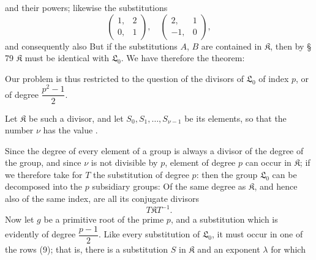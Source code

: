 and their powers; likewise the substitutions
\[
\begin{pmatrix} 1, & 2 \\ 0, & 1 \end{pmatrix},\quad \begin{pmatrix} 2, & 1 \\ -1, & 0 \end{pmatrix},
\]
and consequently also
But if the substitutions $A$, $B$ are contained in $\mathfrak{K}$, then by § 79 $\mathfrak{K}$ must be identical with $\mathfrak{L}_0$. We have therefore the theorem:


Our problem is thus restricted to the question of the divisors of $\mathfrak{L}_0$ of index $p$, or of degree $\dfrac{p^2-1}{2}$.

Let $\mathfrak{K}$ be such a divisor, and let $S_0, S_1, \ldots, S_{\nu-1}$ be its elements, so that the number $\nu$ has the value
.

Since the degree of every element of a group is always a divisor of the degree of the group, and since $\nu$ is not divisible by $p$,  element of degree $p$ can occur in $\mathfrak{K}$; if we therefore take for $T$ the substitution of degree $p$:
then the group $\mathfrak{L}_0$ can be decomposed into the $p$ subsidiary groups:
Of the same degree as $\mathfrak{K}$, and hence also of the same index, are all its conjugate divisors
\[
T\mathfrak{K}T^{-1}.
\]
Now let $g$ be a primitive root of the prime $p$, and
a substitution which is evidently of degree $\dfrac{p-1}{2}$. Like every substitution of $\mathfrak{L}_0$, it must occur in one of the rows (9); that is, there is a substitution $S$ in $\mathfrak{K}$ and an exponent $\lambda$ for which

